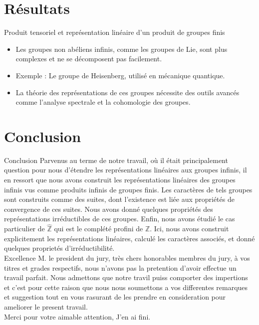 \documentclass[9pt]{beamer}
\begin{document}
	\section{Résultats}
	\begin{frame}{Produit tensoriel et représentation linéaire d'un produit de groupes finis}
		\begin{itemize}
			\item Les groupes non abéliens infinis, comme les groupes de Lie, sont plus complexes et ne se décomposent pas facilement.
			\item Exemple : Le groupe de Heisenberg, utilisé en mécanique quantique.
			\item La théorie des représentations de ces groupes nécessite des outils avancés comme l'analyse spectrale et la cohomologie des groupes.
		\end{itemize}
	\end{frame}


	
	\section{Conclusion}
	\begin{frame}{Conclusion}
	Parvenus au terme de notre travail, où il était principalement question pour nous d'étendre les représentations linéaires aux groupes infinis, il en ressort que nous avons construit les représentations linéaires des groupes infinis vus comme produits infinis de groupes finis.
	Les caractères de tels groupes sont construits comme des suites, dont l'existence est liée aux propriétés de convergence de ces suites. Nous avons donné quelques propriétés des représentations irréductibles de ces groupes.
	Enfin, nous avons étudié le cas particulier de \(\widehat{\mathbb{Z}}\) qui est le complété profini de \( \mathbb{Z} \). Ici, nous avons construit explicitement les représentations linéaires, calculé les caractères associés, et donné quelques proprietés d’irréductibilité.\\
	Excellence M. le president du jury, très chers honorables membres du jury, à vos titres et grades respectifs, nous n'avons pas la pretention d'avoir effectue un travail parfait. Nous admettons que notre travil puiss comporter des impertions et c'est pour cette raison que nous nous soumettons a vos differentes remarques et suggestion tout en vous rasurant de les prendre en consideration pour ameliorer le present travail.\\
	
	Merci pour votre aimable attention, J'en ai fini.
	\end{frame}
	
	
\end{document}

